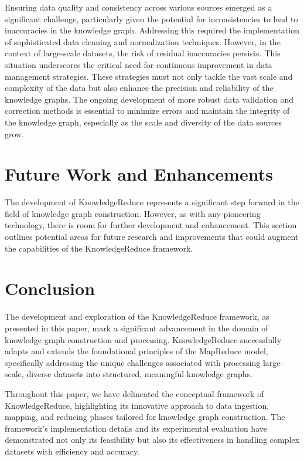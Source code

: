 \documentclass{article}
\begin{document}
Ensuring data quality and consistency across various sources emerged as a significant challenge, particularly given the potential for inconsistencies to lead to inaccuracies in the knowledge graph. Addressing this required the implementation of sophisticated data cleaning and normalization techniques. However, in the context of large-scale datasets, the risk of residual inaccuracies persists. This situation underscores the critical need for continuous improvement in data management strategies. These strategies must not only tackle the vast scale and complexity of the data but also enhance the precision and reliability of the knowledge graphs. The ongoing development of more robust data validation and correction methods is essential to minimize errors and maintain the integrity of the knowledge graph, especially as the scale and diversity of the data sources grow.

\section{Future Work and Enhancements}
The development of KnowledgeReduce represents a significant step forward in the field of knowledge graph construction. However, as with any pioneering technology, there is room for further development and enhancement. This section outlines potential areas for future research and improvements that could augment the capabilities of the KnowledgeReduce framework.

\section{Conclusion}
The development and exploration of the KnowledgeReduce framework, as presented in this paper, mark a significant advancement in the domain of knowledge graph construction and processing. KnowledgeReduce successfully adapts and extends the foundational principles of the MapReduce model, specifically addressing the unique challenges associated with processing large-scale, diverse datasets into structured, meaningful knowledge graphs.

Throughout this paper, we have delineated the conceptual framework of KnowledgeReduce, highlighting its innovative approach to data ingestion, mapping, and reducing phases tailored for knowledge graph construction. The framework's implementation details and its experimental evaluation have demonstrated not only its feasibility but also its effectiveness in handling complex datasets with efficiency and accuracy.
\end{document}
